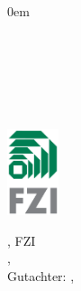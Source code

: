 \pagestyle{empty}
\begingroup
{}
\renewcommand{\baselinestretch}{1}

\begin{titlepage}
  \parindent 0em 
  \LARGE\textbf{\floatingtitle}
  \vspace{24pt}\\
  \\
  \myname \\[1.5cm]
  \begin{center}
  \titlefig\\[1cm]
  \end{center}
  \vfill
  \begin{minipage}{0.4\textwidth}
    \begin{flushleft} \large
      \LARGE\textbf{\thesistype}\\
      \LARGE\releasemonth
    \end{flushleft}
  \end{minipage}
  \begin{minipage}{0.6\textwidth}
    \begin{flushright}
      \includegraphics[width=1.5cm]{graphics/FZI-Logo}
    \end{flushright}
  \end{minipage}
  \newpage
  \small \thesistype, FZI\\
  \department, \releaseyear\\
  Gutachter: \reviewerone, \reviewertwo
  \vfill
  \fzidepartment\\
  \fziname
  \newpage
\end{titlepage}

\endgroup
